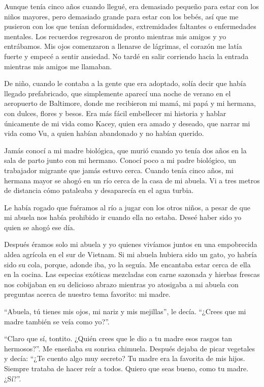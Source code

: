 Aunque tenía cinco años cuando llegué, era demasiado pequeño para estar
con los niños mayores, pero demasiado grande para estar con los bebés,
así que me pusieron con los que tenían deformidades, extremidades
faltantes o enfermedades mentales. Los recuerdos regresaron de pronto
mientras mis amigos y yo entrábamos. Mis ojos comenzaron a llenarse de
lágrimas, el corazón me latía fuerte y empecé a sentir ansiedad. No
tardé en salir corriendo hacia la entrada mientras mis amigos me
llamaban.

De niño, cuando le contaba a la gente que era adoptado, solía decir que
había llegado prefabricado, que simplemente aparecí una noche de verano
en el aeropuerto de Baltimore, donde me recibieron mi mamá, mi papá y mi
hermana, con dulces, flores y besos. Era más fácil embellecer mi
historia y hablar únicamente de mi vida como Kacey, quien era amado y
deseado, que narrar mi vida como Vu, a quien habían abandonado y no
habían querido.

Jamás conocí a mi madre biológica, que murió cuando yo tenía dos años en
la sala de parto junto con mi hermano. Conocí poco a mi padre biológico,
un trabajador migrante que jamás estuvo cerca. Cuando tenía cinco años,
mi hermana mayor se ahogó en un río cerca de la casa de mi abuela. Vi a
tres metros de distancia cómo pataleaba y desaparecía en el agua turbia.

Le había rogado que fuéramos al río a jugar con los otros niños, a pesar
de que mi abuela nos había prohibido ir cuando ella no estaba. Deseé
haber sido yo quien se ahogó ese día.

Después éramos solo mi abuela y yo quienes vivíamos juntos en una
empobrecida aldea agrícola en el sur de Vietnam. Si mi abuela hubiera
sido un gato, yo habría sido su cola, porque, adonde iba, yo la seguía.
Me encantaba estar cerca de ella en la cocina. Las especias exóticas
mezcladas con carne sazonada y hierbas frescas nos cobijaban en su
delicioso abrazo mientras yo atosigaba a mi abuela con preguntas acerca
de nuestro tema favorito: mi madre.

``Abuela, tú tienes mis ojos, mi nariz y mis mejillas'', le decía.
``¿Crees que mi madre también se veía como yo?''.

``Claro que sí, tontito. ¿Quién crees que le dio a tu madre esos rasgos
tan hermosos?''. Me enseñaba su sonrisa chimuela. Después dejaba de
picar vegetales y decía: ``¿Te cuento algo muy secreto? Tu madre era la
favorita de mis hijos. Siempre trataba de hacer reír a todos. Quiero que
seas bueno, como tu madre. ¿Sí?''.


